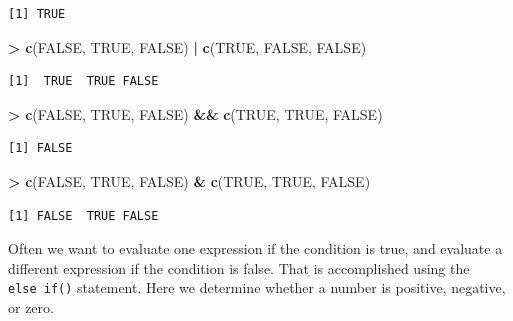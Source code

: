 \documentclass[]{krantz}
\makeatletter
\newenvironment{Shaded}{\begin{snugshade}}{\end{snugshade}}
\newcommand{\KeywordTok}[1]{\textcolor[rgb]{0.27,0.27,0.27}{\textbf{#1}}}
\newcommand{\StringTok}[1]{\textcolor[rgb]{0.5,0.5,0.5}{#1}}
\newcommand{\OtherTok}[1]{\textcolor[rgb]{0.37,0.37,0.37}{#1}}
\newcommand{\OperatorTok}[1]{\textcolor[rgb]{0.43,0.43,0.43}{\textbf{#1}}}
\newcommand{\NormalTok}[1]{#1}
\newenvironment{kframe}{%
\medskip{}
\setlength{\fboxsep}{.8em}
 \def\at@end@of@kframe{}%
 \ifinner\ifhmode%
  \def\at@end@of@kframe{\end{minipage}}%
  \begin{minipage}{\columnwidth}%
 \fi\fi%
 \def\FrameCommand##1{\hskip\@totalleftmargin \hskip-\fboxsep
 \colorbox{shadecolor}{##1}\hskip-\fboxsep
     \hskip-\linewidth \hskip-\@totalleftmargin \hskip\columnwidth}%
 \MakeFramed {\advance\hsize-\width
   \@totalleftmargin\z@ \linewidth\hsize
   \@setminipage}}%
 {\par\unskip\endMakeFramed%
 \at@end@of@kframe}
\renewenvironment{Shaded}{\begin{kframe}}{\end{kframe}}
\theoremstyle{definition}
\theoremstyle{definition}
\theoremstyle{definition}
\theoremstyle{remark}
\makeatother
\begin{document}
\begin{verbatim}
[1] TRUE
\end{verbatim}

\begin{Shaded}
\begin{Highlighting}[]
\OperatorTok{>}\StringTok{ }\KeywordTok{c}\NormalTok{(}\OtherTok{FALSE}\NormalTok{, }\OtherTok{TRUE}\NormalTok{, }\OtherTok{FALSE}\NormalTok{) }\OperatorTok{|}\StringTok{ }\KeywordTok{c}\NormalTok{(}\OtherTok{TRUE}\NormalTok{, }\OtherTok{FALSE}\NormalTok{, }\OtherTok{FALSE}\NormalTok{)}
\end{Highlighting}
\end{Shaded}

\begin{verbatim}
[1]  TRUE  TRUE FALSE
\end{verbatim}

\begin{Shaded}
\begin{Highlighting}[]
\OperatorTok{>}\StringTok{ }\KeywordTok{c}\NormalTok{(}\OtherTok{FALSE}\NormalTok{, }\OtherTok{TRUE}\NormalTok{, }\OtherTok{FALSE}\NormalTok{) }\OperatorTok{&&}\StringTok{ }\KeywordTok{c}\NormalTok{(}\OtherTok{TRUE}\NormalTok{, }\OtherTok{TRUE}\NormalTok{, }\OtherTok{FALSE}\NormalTok{)}
\end{Highlighting}
\end{Shaded}

\begin{verbatim}
[1] FALSE
\end{verbatim}

\begin{Shaded}
\begin{Highlighting}[]
\OperatorTok{>}\StringTok{ }\KeywordTok{c}\NormalTok{(}\OtherTok{FALSE}\NormalTok{, }\OtherTok{TRUE}\NormalTok{, }\OtherTok{FALSE}\NormalTok{) }\OperatorTok{&}\StringTok{ }\KeywordTok{c}\NormalTok{(}\OtherTok{TRUE}\NormalTok{, }\OtherTok{TRUE}\NormalTok{, }\OtherTok{FALSE}\NormalTok{)}
\end{Highlighting}
\end{Shaded}

\begin{verbatim}
[1] FALSE  TRUE FALSE
\end{verbatim}

Often we want to evaluate one expression if the condition is true, and
evaluate a different expression if the condition is false. That is
accomplished using the \texttt{else\ if()} statement. Here we determine
whether a number is positive, negative, or zero.
\end{document}
